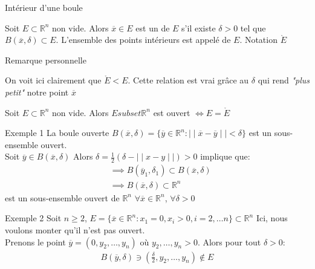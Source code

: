 \begin{parag}{Intérieur d'une boule}
    \begin{definition}
        Soit $E \subset \mathbb{R}^n $ non vide. Alors $ \overline{x} \in E$ est un  de $E$ s'il existe $ \delta > 0$ tel que $B( \overline{x}, \delta) \subset E$. L'ensemble des points intérieurs est appelé  de $E$. Notation $ \mathring{E}$
    \end{definition}
   \begin{subparag}{Remarque personnelle}
       \begin{framedremark}
           On voit ici clairement que $ \mathring{E} < E$. Cette relation est vrai grâce au $ \delta$ qui rend \textit{"plus petit"} notre point $ \overline{x}$
       \end{framedremark}
   \end{subparag}
   Soit $E \subset \mathbb{R}^n $ non vide. Alors $E subset \mathbb{R}^n $ est ouvert $\iff E = \mathring{E}$
   \begin{subparag}{Exemple 1}
       La boule ouverte $B( \overline{x}, \delta) = \{ \overline{y} \in \mathbb{R}^n : \mid  \mid \overline{x} - \overline{y} \mid \mid < \delta \}$ est un sous-ensemble ouvert.\\
       Soit $ \overline{y} \in B( \overline{x}, \delta)$ Alors $ \delta = \frac{1}{2}( \delta - \mid  \mid x - y \mid \mid)  > 0$ implique que:
       \begin{align*}
         &\implies  B( \overline{y}_1, \delta_1) \subset B( \overline{x}, \delta) \\
         &\implies B( \overline{x}, \delta) \subset \mathbb{R}^n 
       \end{align*}
       est un sous-ensemble ouvert de $ \mathbb{R}^n $ $ \forall \overline{x} \in \mathbb{R}^n $, $ \forall \delta > 0$
   \end{subparag}
   \begin{subparag}{Exemple 2}
       Soit $n \geq 2$, $E = \{ \overline{x} \in \mathbb{R}^n  : x_1 = 0, x_i > 0, i = 2, \dots n\} \subset \mathbb{R}^n $
       Ici, nous voulons monter qu'il n'est pas ouvert. \\
       Prenons le point $ \overline{y} = (0, y_2, \dots, y_n)$ où $y_2, \dots, y_n > 0$. Alors pour tout $ \delta > 0$:
       \begin{align*}
           B( \overline{y}, \delta) \ni ( \frac{ \delta}{2}, y_2, \dots, y_n) \notin E
       \end{align*}
       

\end{subparag}
\end{parag}
